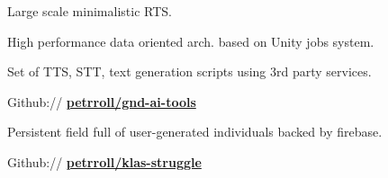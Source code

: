 \documentclass[a4paper]{deedy-resume} %
\begin{document}
\begin{minipage}[t]{0.62\textwidth}
\sectionspace %





\emptyLocation %
\begin{tightitemize}
\item Large scale minimalistic RTS.
\item High performance data oriented arch. based on Unity jobs system.
\end{tightitemize}

\sectionspace %


\emptyLocation %
\begin{tightitemize}
\item Set of TTS, STT, text generation scripts using 3rd party services.
\item Github:// \href{https://github.com/petrroll/gnd-ai-tools}{\bf petrroll/gnd-ai-tools}
\end{tightitemize}

\sectionspace %



\emptyLocation %
\begin{tightitemize}
\item Persistent field full of user-generated individuals backed by firebase.
\item Github:// \href{https://github.com/petrroll/klas-struggle}{\bf petrroll/klas-struggle}
\end{tightitemize}


\end{minipage}
\end{document}
